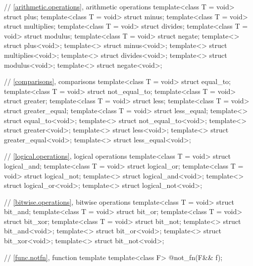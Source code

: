 \documentclass[ebook,11pt,article]{memoir}
\begin{document}
{\begin{addedblock}
\begin{codeblock}
\end{codeblock}
\end{addedblock}
\begin{removedblock}
\begin{codeblock}
  // \ref{arithmetic.operations}, arithmetic operations
  template<class T = void> struct plus;
  template<class T = void> struct minus;
  template<class T = void> struct multiplies;
  template<class T = void> struct divides;
  template<class T = void> struct modulus;
  template<class T = void> struct negate;
  template<> struct plus<void>;
  template<> struct minus<void>;
  template<> struct multiplies<void>;
  template<> struct divides<void>;
  template<> struct modulus<void>;
  template<> struct negate<void>;
  
  // \ref{comparisons}, comparisons
  template<class T = void> struct equal_to;
  template<class T = void> struct not_equal_to;
  template<class T = void> struct greater;
  template<class T = void> struct less;
  template<class T = void> struct greater_equal;
  template<class T = void> struct less_equal;
  template<> struct equal_to<void>;
  template<> struct not_equal_to<void>;
  template<> struct greater<void>;
  template<> struct less<void>;
  template<> struct greater_equal<void>;
  template<> struct less_equal<void>;

  // \ref{logical.operations}, logical operations
  template<class T = void> struct logical_and;
  template<class T = void> struct logical_or;
  template<class T = void> struct logical_not;
  template<> struct logical_and<void>;
  template<> struct logical_or<void>;
  template<> struct logical_not<void>;

  // \ref{bitwise.operations}, bitwise operations
  template<class T = void> struct bit_and;
  template<class T = void> struct bit_or;
  template<class T = void> struct bit_xor;
  template<class T = void> struct bit_not;
  template<> struct bit_and<void>;
  template<> struct bit_or<void>;
  template<> struct bit_xor<void>;
  template<> struct bit_not<void>;
\end{codeblock}
\end{removedblock}
\begin{codeblock}

  // \ref{func.notfn}, function template 
  template<class F> @\unspec@ not_fn(F&& f);

\end{codeblock}
\begin{removedblock}
\begin{codeblock}


\end{codeblock}
\end{removedblock}}
\end{document}

